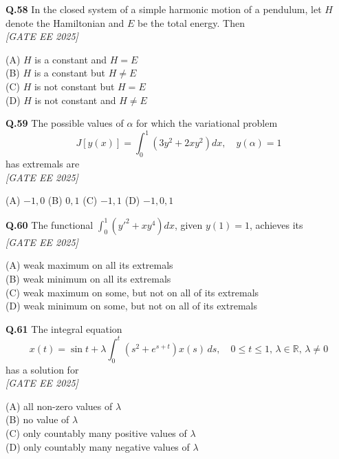 \documentclass[11pt]{article}
\begin{document}
\begin{flushleft}
\textbf{Q.58} In the closed system of a simple harmonic motion of a pendulum, let $H$ denote the Hamiltonian and $E$ be the total energy. Then
\\[1ex] \textit{[GATE EE 2025]}

(A) $H$ is a constant and $H = E$ \\
(B) $H$ is a constant but $H \neq E$ \\
(C) $H$ is not constant but $H = E$ \\
(D) $H$ is not constant and $H \neq E$
\end{flushleft}

\begin{flushleft}
\textbf{Q.59} The possible values of $\alpha$ for which the variational problem
\[
J[y(x)] = \int_0^1 \left( 3y^2 + 2x y^2 \right) dx, \quad y(\alpha) = 1
\]
has extremals are 
\\[1ex] \textit{[GATE EE 2025]}

(A) $-1, 0$ \hspace{2em} (B) $0, 1$ \hspace{2em} (C) $-1, 1$ \hspace{2em} (D) $-1, 0, 1$
\end{flushleft}

\begin{flushleft}
\textbf{Q.60} The functional $\displaystyle \int_0^1 (y'^2 + x y^4) dx$, given $y(1) = 1$, achieves its 
\\[1ex] \textit{[GATE EE 2025]}

(A) weak maximum on all its extremals \\
(B) weak minimum on all its extremals \\
(C) weak maximum on some, but not on all of its extremals \\
(D) weak minimum on some, but not on all of its extremals
\end{flushleft}

\begin{flushleft}
\textbf{Q.61} The integral equation
\[
x(t) = \sin t + \lambda \int_0^t \left( s^2 + e^{s+t} \right) x(s) \, ds, \quad 0 \leq t \leq 1, \, \lambda \in \mathbb{R}, \, \lambda \neq 0
\]
has a solution for
\\[1ex] \textit{[GATE EE 2025]}

(A) all non-zero values of $\lambda$ \\
(B) no value of $\lambda$ \\
(C) only countably many positive values of $\lambda$ \\
(D) only countably many negative values of $\lambda$
\end{flushleft}
\end{document}
